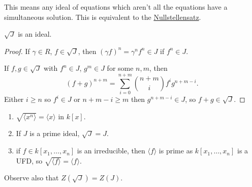 \documentclass{article}
\begin{document}
\begin{remark}
    This means any ideal of equations which aren't all the equations have a simultaneous solution.
    This is equivalent to the \hyperlink{def:null1}{Nullstellensatz}.
\end{remark}
\begin{lemma}
    \hyperlink{def:radical}{$\sqrt{J}$} is an ideal.
\end{lemma}
\begin{proof}
    If $\gamma \in R$, $f \in \sqrt{J}$, then $(\gamma f)^n = \gamma^n f^n \in J$ if $f^n \in J$.

    If $f, g \in \sqrt{J}$ with $f^n \in J$, $g^m \in J$ for some $n, m$, then
    \begin{equation*}(f+g)^{n+m} = \sum_{i=0}^{n+m} \binom{n+m}{i} f^i g^{n+m-i}.\end{equation*}
    Either $i \geq n$ so $f^i \in J$ or $n+m-i\geq m$ then $g^{n+m-i} \in J$, so $f+g \in \sqrt{J}$.
\end{proof}

\begin{eg}
    \leavevmode
    \begin{enumerate}[label=(\arabic*)]
        \item $\sqrt{\langle x^n \rangle} = \langle x \rangle$ in $k[x]$.
        \item If $J$ is a prime ideal, $\sqrt{J} = J$.
        \item if $f \in k[x_1, \dotsc, x_n]$ is an irreducible, then $\langle f \rangle$ is prime as $k[x_1, \dotsc, x_n]$ is a UFD, so $\sqrt{ \langle f \rangle} = \langle f \rangle$.
    \end{enumerate}
\end{eg}
Observe also that $Z(\sqrt{J}) = Z(J)$.
\end{document}
